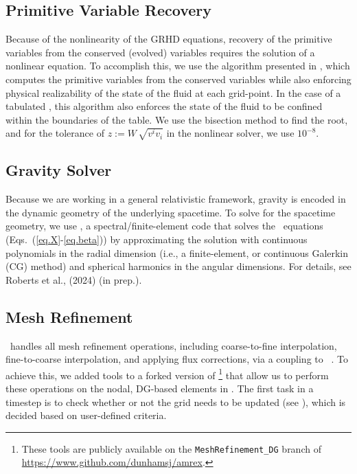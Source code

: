 \subsection{Primitive Variable Recovery}
\label{ss.primitiveRecovery}

Because of the nonlinearity of the GRHD equations,
recovery of the primitive variables from the conserved (evolved)
variables requires the solution of a nonlinear equation.
To accomplish this, we use the algorithm presented in \citet{gkr2013,rz2013},
which computes the primitive variables from the conserved variables
while also enforcing physical realizability of the
state of the fluid at each grid-point.
In the case of a tabulated \eos, this algorithm also enforces the state of
the fluid to be confined within the boundaries of the table.
We use the bisection method to find the root, and
for the tolerance of $z:=W\,\sqrt{v^{i}v_{i}}$ in the nonlinear solver,
we use $10^{-8}$.

\subsection{Gravity Solver}

Because we are working in a general relativistic framework, gravity is encoded
in the dynamic geometry of the underlying spacetime.
To solve for the spacetime geometry, we use \poseidon,
a spectral/finite-element code that solves the \xcfc\ equations
(Eqs.~(\ref{eq.X}-\ref{eq.beta}))
by approximating the solution with continuous polynomials
in the radial dimension
(i.e., a finite-element, or continuous Galerkin (CG) method)
and spherical harmonics in the angular dimensions.
For details, see Roberts et al., (2024) (in prep.).

\subsection{Mesh Refinement}
\label{ss.mr}

\thornado\ handles all mesh refinement operations,
including coarse-to-fine interpolation, fine-to-coarse interpolation,
and applying flux corrections,
via a coupling to \amrex\ \citep{zab2019}.
To achieve this, we added tools to a forked version of \amrex%
\footnote{These tools are publicly available on the
\texttt{MeshRefinement\_DG} branch of
\url{https://www.github.com/dunhamsj/amrex}.}
that allow us to perform these operations on the nodal, DG-based elements in
\thornado.
The first task in a timestep is to check whether or not the grid needs to
be updated (see ), which is decided based on user-defined
criteria.

